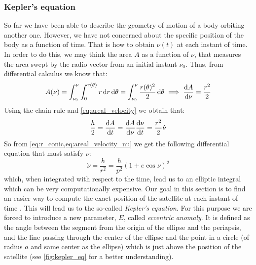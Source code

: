 \documentclass[../main.tex]{subfiles}
\begin{document}
\subsubsection{Kepler's equation}\label{sec:kepler_equation}
So far we have been able to describe the geometry of motion of a body orbiting another one. However, we have not concerned about the specific position of the body as a function of time. That is how to obtain $\nu(t)$ at each instant of time. In order to do this, we may think the area $A$ as a function of $\nu$, that measures the area swept by the radio vector from an initial instant $\nu_0$. Thus, from differential calculus we know that:
\begin{equation}
  A(\nu)=\int_{\nu_0}^{\nu}\int_{0}^{r(\theta)}r\dd{r}\dd{\theta}=\int_{\nu_0}^{\nu}\frac{r(\theta)^2}{2}\dd{\theta}\implies\dv{A}{\nu}=\frac{r^2}{2}
\end{equation}
Using the chain rule and \cref{eq:areal_velocity} we obtain that:
\begin{equation}\label{eq:areal_velocity_nu}
  \frac{h}{2}=\dv{A}{t}=\dv{A}{\nu}\dv{\nu}{t}=\frac{r^2}{2}\dot\nu
\end{equation}
So from \cref{eq:r_conic,eq:areal_velocity_nu} we get the following differential equation that must satisfy $\nu$:
\begin{equation}
  \dot\nu=\frac{h}{r^2}=\frac{h}{p^2}{(1+e\cos\nu)}^2
\end{equation}
which, when integrated with respect to the time, lead us to an elliptic integral which can be very computationally expensive. Our goal in this section is to find an easier way to compute the exact position of the satellite at each instant of time \cite{montenbruck}. This will lead us to the so-called \emph{Kepler's equation}. For this purpose we are forced to introduce a new parameter, $E$, called \emph{eccentric anomaly}. It is defined as the angle between the segment from the origin of the ellipse and the periapsis, and the line passing through the center of the ellipse and the point in a circle (of radius $a$ and same center as the ellipse) which is just above the position of the satellite (see \cref{fig:kepler_eq} for a better understanding).
\end{document}
